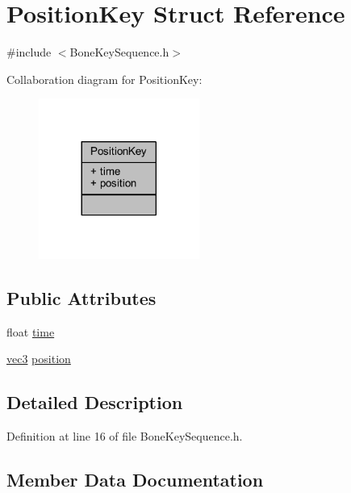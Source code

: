 \hypertarget{struct_position_key}{}\section{Position\+Key Struct Reference}
\label{struct_position_key}


{\ttfamily \#include $<$Bone\+Key\+Sequence.\+h$>$}



Collaboration diagram for Position\+Key\+:\nopagebreak
\begin{figure}[H]
\begin{center}
\leavevmode
\includegraphics[width=149pt]{struct_position_key__coll__graph}
\end{center}
\end{figure}
\subsection*{Public Attributes}
\begin{DoxyCompactItemize}
\item 
float \hyperlink{struct_position_key_ab18d1c0baf9f835e2dbd8b8663d552f4}{time}
\item 
\hyperlink{_types_8h_a3d0ce73e3199de81565fb01632415288}{vec3} \hyperlink{struct_position_key_a6b7f3212adb099bc1b5d86513ef2fd36}{position}
\end{DoxyCompactItemize}


\subsection{Detailed Description}


Definition at line 16 of file Bone\+Key\+Sequence.\+h.



\subsection{Member Data Documentation}
